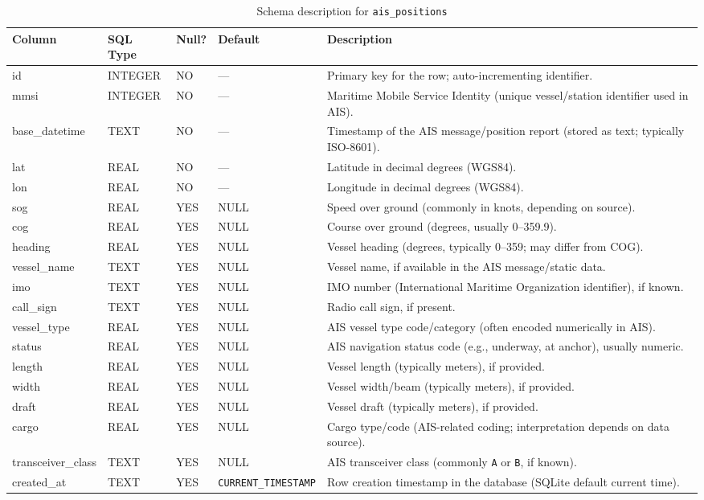 \documentclass[11pt]{article}
\begin{document}
\begin{table}[H]
\centering
\caption{Schema description for \texttt{ais\_positions}}
\label{tab:ais_positions_schema}
\begin{tabularx}{\textwidth}{lllp{}X}
\hline
\textbf{Column} & \textbf{SQL Type} & \textbf{Null?} & \textbf{Default} & \textbf{Description} \\
\hline
id & INTEGER & NO & --- & Primary key for the row; auto-incrementing identifier. \\
mmsi & INTEGER & NO & --- & Maritime Mobile Service Identity (unique vessel/station identifier used in AIS). \\
base\_datetime & TEXT & NO & --- & Timestamp of the AIS message/position report (stored as text; typically ISO-8601). \\
lat & REAL & NO & --- & Latitude in decimal degrees (WGS84). \\
lon & REAL & NO & --- & Longitude in decimal degrees (WGS84). \\
sog & REAL & YES & NULL & Speed over ground (commonly in knots, depending on source). \\
cog & REAL & YES & NULL & Course over ground (degrees, usually 0--359.9). \\
heading & REAL & YES & NULL & Vessel heading (degrees, typically 0--359; may differ from COG). \\
vessel\_name & TEXT & YES & NULL & Vessel name, if available in the AIS message/static data. \\
imo & TEXT & YES & NULL & IMO number (International Maritime Organization identifier), if known. \\
call\_sign & TEXT & YES & NULL & Radio call sign, if present. \\
vessel\_type & REAL & YES & NULL & AIS vessel type code/category (often encoded numerically in AIS). \\
status & REAL & YES & NULL & AIS navigation status code (e.g., underway, at anchor), usually numeric. \\
length & REAL & YES & NULL & Vessel length (typically meters), if provided. \\
width & REAL & YES & NULL & Vessel width/beam (typically meters), if provided. \\
draft & REAL & YES & NULL & Vessel draft (typically meters), if provided. \\
cargo & REAL & YES & NULL & Cargo type/code (AIS-related coding; interpretation depends on data source). \\
transceiver\_class & TEXT & YES & NULL & AIS transceiver class (commonly \texttt{A} or \texttt{B}, if known). \\
created\_at & TEXT & YES & \texttt{CURRENT\_TIMESTAMP} & Row creation timestamp in the database (SQLite default current time). \\
\hline
\end{tabularx}
\end{table}
\end{document}
